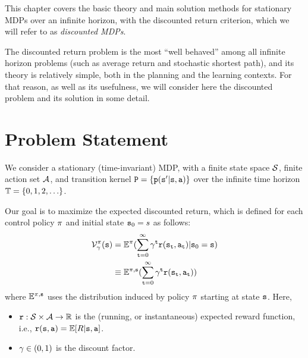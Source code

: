 This chapter covers the basic theory and main solution methods for
stationary MDPs over an infinite horizon, with the discounted return
criterion, which we will refer to as \textit{discounted MDPs}. 

The discounted return problem is the most ``well behaved'' among all
infinite horizon problems (such as average return and stochastic
shortest path), and its theory is relatively simple, both in
the planning and the learning contexts. For that reason, as well as
its usefulness, we will consider here the discounted problem and its
solution in some detail.


\section{Problem Statement} \label{sec:inf_horizon_prob}

We consider a stationary (time-invariant) MDP, with a finite state
space $\mathcal{S}$, finite action set $\mathcal{A}$, and transition kernel
${\tt P} = \{{\tt p}({\tt s}'|{\tt s},{\tt a})\}$ over  the infinite time horizon
${\mathbb{T}} = \{ 0,1,2, \ldots \} $.

Our goal is to maximize the expected discounted return, which is
defined for each control policy $\pi $ and initial state
${{\tt s}_0} = s$ as follows:
\begin{align*}
\mathcal{V}_\gamma ^\pi ({\tt s}) &= {\mathbb{E}^\pi }(\sum\limits_{{\tt t} = 0}^\infty  {{\gamma^{\tt t}}{\tt r}({{\tt s}_{\tt t}},{{\tt a}_{\tt t}})} |{{\tt s}_0} = {\tt s})\\
 &\equiv {\ensuremath{\mathbb{E}}^{\pi,{\tt s}}}(\sum\limits_{{\tt t} = 0}^\infty  {{\gamma^{\tt t}}{\tt r}({{\tt s}_{\tt t}},{{\tt a}_{\tt t}})} )
\end{align*}
where $\mathbb{E}^{\pi ,{\tt s}}$ uses the distribution induced by policy
$\pi$ starting at state ${\tt s}$. Here,
\begin{itemize}
  \item ${\tt r} : \mathcal{S} \times \mathcal{A} \to \mathbb R$ is the (running, or instantaneous) expected reward function, i.e., ${\tt r}({\tt s},{\tt a})=\mathbb{E}[R|{\tt s},{\tt a}]$.
  \item $\gamma  \in (0,1)$ is the discount factor.
\end{itemize}

